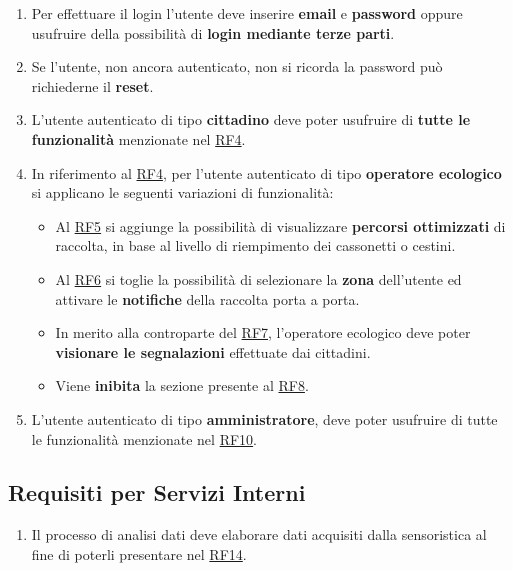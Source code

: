 \begin{enumerate}[start=19,label=\textbf{RF\theenumi}, labelwidth=4em, left=0pt, align=left, itemindent=-0.6em]

\item \label{itm:RF19} Per effettuare il login l’utente deve inserire \textbf{email} e \textbf{password} oppure usufruire della possibilità di \textbf{login mediante terze parti}.

\item \label{itm:RF20} Se l’utente, non ancora autenticato, non si ricorda la password può richiederne il \textbf{reset}.
    
\item \label{itm:RF21} L’utente autenticato di tipo \textbf{cittadino} deve poter usufruire di \textbf{tutte le funzionalità} menzionate nel \hyperref[itm:RF4]{RF4}.

\item \label{itm:RF22} In riferimento al \hyperref[itm:RF4]{RF4}, per l'utente autenticato di tipo \textbf{operatore ecologico} si applicano le seguenti variazioni di funzionalità:
\begin{itemize}
        \item Al \hyperref[itm:RF5]{RF5} si aggiunge la possibilità di visualizzare \textbf{percorsi ottimizzati} di raccolta, in base al livello di riempimento dei cassonetti o cestini.
        \item Al \hyperref[itm:RF6]{RF6} si toglie la possibilità di selezionare la \textbf{zona} dell'utente ed attivare le \textbf{notifiche} della raccolta porta a porta.
        \item  In merito alla controparte del \hyperref[itm:RF7]{RF7}, l'operatore ecologico deve poter \textbf{visionare le segnalazioni} effettuate dai cittadini.
        \item Viene \textbf{inibita} la sezione presente al \hyperref[itm:RF8]{RF8}.
    \end{itemize}
    
\item \label{itm:RF23} L'utente autenticato di tipo \textbf{amministratore}, deve poter usufruire di tutte le funzionalità menzionate nel \hyperref[itm:RF10]{RF10}.
\end{enumerate}

\subsection{Requisiti per Servizi Interni}
\begin{enumerate}[start=24,label=\textbf{RF\theenumi}, labelwidth=4em, left=0pt, align=left, itemindent=-0.6em]

    \item \label{itm:RF24} Il processo di analisi dati deve elaborare dati acquisiti dalla sensoristica al fine di poterli presentare nel \hyperref[itm:RF14]{RF14}.
    
\end{enumerate}
